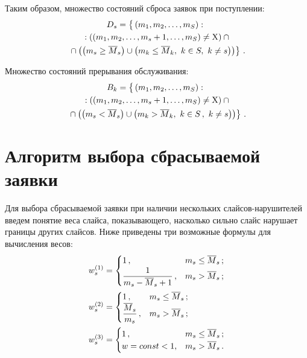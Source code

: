 \begin{multicols}{2}
  Таким образом, множество состояний сброса заявок при поступлении:
  \begin{multline*}
  D_s=\left\{\vphantom{\left(\overline{M}_k\right)}\left (m_1, m_2, \ldots , m_S\right): {}\right.\\
{}:  \left( \left(m_1, m_2, \ldots , m_s+1, \ldots , m_S\right)\not= 
\mathrm{X}\right)\cap{}\\ 
\left.{}\cap\left( \left( m_s\geq \overline{M}_s\right) \cup \left( m_k\leq 
\overline{M}_k,\ k\in S,\ k\not=s\right)\right)
  \right\}\,.
\end{multline*}
  
  Множество состояний прерывания обслуживания:
\begin{multline*}
  B_k=\left\{ \vphantom{\left(\overline{M}_k\right)}
  \left( m_1, m_2, \ldots , m_S\right) :{}\right.\\
  {}: \left( \left( m_1, m_2, \ldots , m_s+1, \ldots , 
m_S\right) \not=\mathrm{X}\right) \cap {}\\
\left.{}\cap\left( \left( m_s<\overline{M}_s\right) \cup 
\left( m_k>\overline{M}_k,\ k\in S\,,\ k\not= s\right)\right)\right\}\,.
\end{multline*}

\section{Алгоритм выбора сбрасываемой заявки}

  Для выбора сбрасываемой заявки при наличии нескольких  
слай\-сов-на\-ру\-ши\-те\-лей введем понятие веса слайса, показывающего, 
насколько сильно слайс нарушает границы других слайсов. Ниже приведены 
три возможные формулы для вычисления весов: 
\begin{align*}
 w_s^{(1)}&=\begin{cases}
  1\,, & m_s\leq \overline{M}_s\,;\\
  \fr{1}{m_s-\overline{M}_s+1}\,, & m_s>\overline{M}_s\,;
  \end{cases}\\
  w_s^{(2)}&=\begin{cases}
  1\,, & m_s\leq \overline{M}_s\,;\\
  \fr{\overline{M}_s}{m_s}\,, & m_s>\overline{M}_s\,;
  \end{cases}\\
  w_s^{(3)}&=\begin{cases}
  1\,, & m_s\leq \overline{M}_s\,;\\
  w=const<1, & m_s>\overline{M}_s\,.
  \end{cases} %
\end{align*}
 

\end{multicols}
